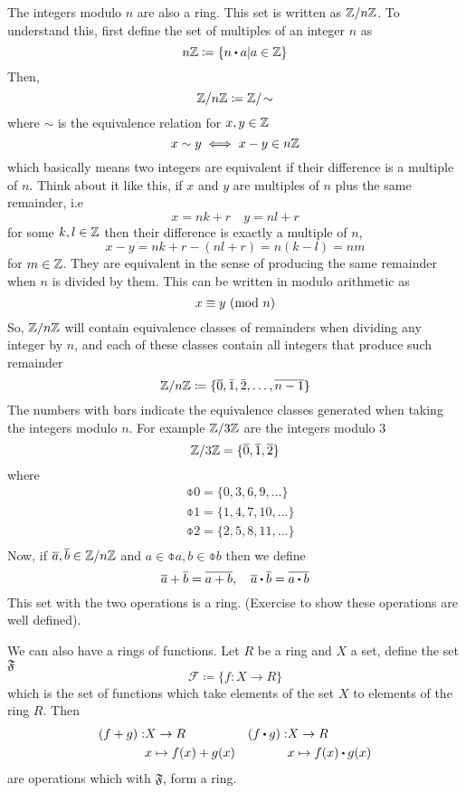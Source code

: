 \documentclass[../Main.tex]{subfiles}
\begin{document}
\begin{example}
	The integers modulo $n$ are also a ring. This set is written as $\mathbb{Z}/n\mathbb{Z}$. To understand this, first define the set of multiples of an integer $n$ as
	\[n\Z \coloneqq \{n\rdot a|a\in \Z\} \]
	Then,
	\[\mathbb{Z}/n\mathbb{Z} \coloneqq \mathbb{Z}/\!\sim\]
	where $\sim$ is the equivalence relation for $x,y\in\mathbb{Z}$
	\[x\sim y\iff x-y\in n\mathbb{Z}\]
	which basically means two integers are equivalent if their difference is a multiple of $n$. Think about it like this, if $x$ and $y$ are multiples of $n$ plus the same remainder, i.e
	\[x = nk+r \quad y = nl+r\]
	for some $k,l\in \mathbb{Z}$ then their difference is exactly a multiple of $n$,
	\[x-y = nk+r - (nl+r) = n(k-l) = nm\]
	for $m\in \mathbb{Z}$. They are equivalent in the sense of producing the same remainder when $n$ is divided by them. This can be written in modulo arithmetic as
	\[x\equiv y \ (\mathrm{mod}\ n)\]
	So, $\mathbb{Z}/n\mathbb{Z}$ will contain equivalence classes of remainders when dividing any integer by $n$, and each of these classes contain all integers that produce such remainder
	\[\mathbb{Z}/n\mathbb{Z} \coloneqq \{\overline{0},\bar{1},\bar{2},\dots,\overline{n-1}\}\]
	The numbers with bars indicate the equivalence classes generated when taking the integers modulo $n$. For example $\mathbb{Z}/3\mathbb{Z}$ are the integers modulo $3$
	\[\mathbb{Z}/3\mathbb{Z} = \{\overline{0},\overline{1},\overline{2}\}\]
	where
	\begin{align*}
	&\obar{0} = \{0,3,6,9,\dots\}\\
	&\obar{1} = \{1,4,7,10,\dots\}\\
	&\obar{2} = \{2,5,8,11,\dots\}\\
	\end{align*}
	Now, if $\overline{a}, \overline{b} \in \mathbb{Z}/n\mathbb{Z}$ and $a\in \obar{a}, b\in\obar{b}$ then we define
	\[\obar{a}+\obar{b}=\obar{a+b},\quad \obar{a}\rdot\obar{b}=\obar{a\rdot b}\]
	This set with the two operations is a ring.
	(Exercise to show these operations are well defined).
\end{example}
\begin{example}
	We can also have a rings of functions. Let $R$ be a ring and $X$ a set, define the set $\mathfrak{F}$
	\[\mathcal{F}\coloneqq\{f: X\to R\}\]
	which is the set of functions which take elements of the set $X$ to elements of the ring $R$.
	Then
	\begin{align*}
		(f+g): &X\to R &(f\rdot g):&X\to R\\
		&x\mapsto f(x)+g(x)&&x\mapsto f(x)\rdot g(x)
	\end{align*}
	are operations which with $\mathfrak{F}$, form a ring.
\end{example}
\end{document}
